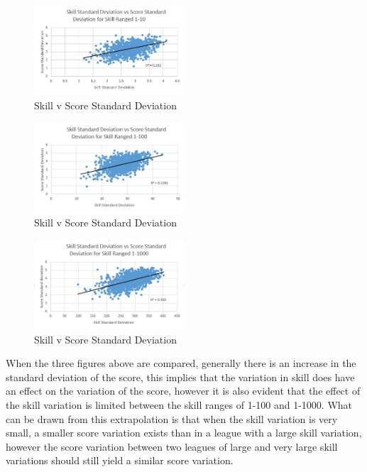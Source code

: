 \documentclass[12pt]{article}
\begin{document}
\begin{figure}[H]
\centering
\includegraphics[width=0.5\textwidth]{skill_score_1.jpg}
\caption{Skill v Score Standard Deviation}
\end{figure}

\begin{figure}[H]
\centering
\includegraphics[width=0.5\textwidth]{skill_score_2.jpg}
\caption{Skill v Score Standard Deviation}
\end{figure}

\begin{figure}[H]
\centering
\includegraphics[width=0.5\textwidth]{skill_score_3.jpg}
\caption{Skill v Score Standard Deviation}
\end{figure}

When the three figures above are compared, generally there is an increase in the standard deviation of the score, this implies that the variation in skill does have an effect on the variation of the score, however it is also evident that the effect of the skill variation is limited between the skill ranges of 1-100 and 1-1000. What can be drawn from this extrapolation is that when the skill variation is very small, a smaller score variation exists than in a league with a large skill variation, however the score variation between two leagues of large and very large skill variations should still yield a similar score variation.\cite{tijms}
\clearpage
\end{document}
